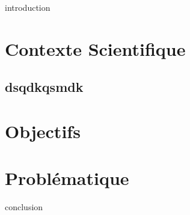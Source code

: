 
\chaptertoc{}

\label{sec:2-int}
{introduction}

\section{Contexte Scientifique}
\label{sec:2-1}


\subsection{dsqdkqsmdk}


\section{Objectifs}
\label{sec:2-2}


\section{Problématique}
\label{sec:2-2}


\label{sec:2-cnc}
{conclusion}


